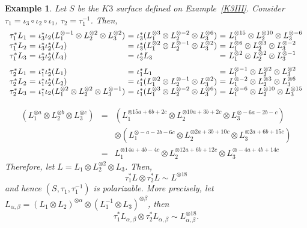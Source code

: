 \documentclass[11pt,letterpaper]{amsart}
\newtheorem{ex}[thm]{Example}
\begin{document}
    \begin{ex}\label{K3IIIB}
         Let $S$ be the $K3$ surface defined on Example~\ref{K3III}. Consider $\tau_1 = \iota_3\circ \iota_2 \circ \iota_1$, $\tau_2 = \tau_1^{-1}$. Then,
        \[
        \begin{array}{c@{~=~}l@{~=~}l@{~=~}l}
        \tau_1^*L_1 & \iota_3^* \iota_2 (L_1^{\otimes -1} \otimes  L_2^{\otimes 2} \otimes L_3^{\otimes 2}) &
        \iota_3^*(L_1^{\otimes 3} \otimes  L_2^{\otimes -2} \otimes L_3^{\otimes 6}) &
        L_1^{\otimes 15} \otimes  L_2^{\otimes 10} \otimes L_3^{\otimes -6} \\
        \tau_1^*L_2 & \iota_3^*\iota_2^* (L_2) &  \iota_3^*(L_1^{\otimes 2} \otimes  L_2^{\otimes -1} \otimes L_3^{\otimes 2}) &
        L_1^{\otimes 6} \otimes  L_2^{\otimes 3} \otimes L_3^{\otimes -2} \\
        \tau_1^*L_3 & \iota_3^*\iota_2^* (L_3) & \iota_3^* L_3 & L_1^{\otimes 2} \otimes  L_2^{\otimes 2} \otimes L_3^{\otimes -1}
        \end{array}
        \]
        \[
        \begin{array}{c@{~=~}l@{~=~}l@{~=~}l}
        \tau_2^*L_1 & \iota_1^*\iota_2^* (L_1) & \iota_1^* L_1 & L_1^{\otimes -1} \otimes  L_2^{\otimes 2} \otimes L_3^{\otimes 2}\\
        \tau_2^*L_2 & \iota_1^*\iota_2^* (L_2) &  \iota_1^*(L_1^{\otimes 2} \otimes  L_2^{\otimes -1} \otimes L_3^{\otimes 2}) &
        L_1^{\otimes -2} \otimes  L_2^{\otimes 3} \otimes L_3^{\otimes 6} \\
        \tau_2^*L_3 & \iota_1^* \iota_2 (L_1^{\otimes 2} \otimes  L_2^{\otimes 2} \otimes L_3^{\otimes -1}) &
        \iota_1^*(L_1^{\otimes 3} \otimes  L_2^{\otimes -2} \otimes L_3^{\otimes 6}) & L_1^{\otimes -6} \otimes  L_2^{\otimes 10} \otimes L_3^{\otimes 15} \\
        \end{array}
        \]

        \begin{eqnarray*}
        [\tau_1^*\otimes \tau_2^*](L_1^{\otimes a} \otimes  L_2^{\otimes b} \otimes L_3^{\otimes c})
         &=& (L_1^{\otimes 15a+6b+2c} \otimes  L_2^{\otimes 10a+3b+2c} \otimes L_3^{\otimes -6a-2b-c}) \\
         & & \otimes (L_1^{\otimes -a-2b-6c} \otimes  L_2^{\otimes  2a+3b+ 10c } \otimes L_3^{\otimes 2a+6b+15c}) \\
         &=&          L_1^{\otimes 14a+4b-4c} \otimes  L_2^{\otimes 12a+6b+12c} \otimes L_3^{\otimes -4a+4b+14c}
        \end{eqnarray*}
        Therefore, let $L = L_1 \otimes L_2^{\otimes 2} \otimes L_3$. Then,
        \[
        \tau_1^*L \otimes \tau_2^*L \sim L^{\otimes 18}
        \]
        and hence
        $(S, \tau_1, \tau_1^{-1})$ is polarizable. More precisely, let $L_{\alpha, \beta} = (L_1 \otimes L_2)^{\otimes \alpha} \otimes (L_1^{-1} \otimes L_3)^{\otimes \beta}$, then
        \[
        \tau_1^*L_{\alpha, \beta} \otimes \tau_2^*L_{\alpha, \beta} \sim L_{\alpha, \beta}^{\otimes 18}.
        \]


\end{ex}
\end{document}
